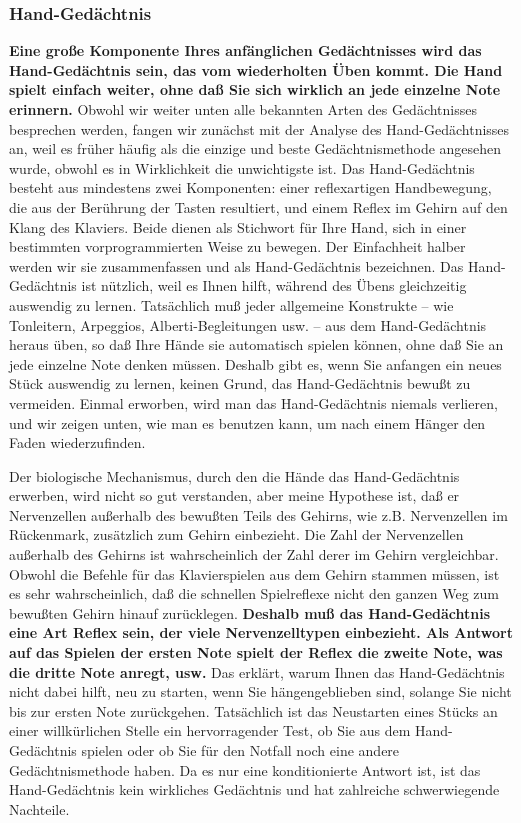 \subsubsection{Hand-Gedächtnis}
\label{c1iii6d}

\textbf{Eine große Komponente Ihres anfänglichen Gedächtnisses wird das Hand-Gedächtnis sein, das vom wiederholten Üben kommt.
Die Hand spielt einfach weiter, ohne daß Sie sich wirklich an jede einzelne Note  erinnern.}
Obwohl wir weiter unten alle bekannten Arten des Gedächtnisses besprechen werden, fangen wir zunächst mit der Analyse des Hand-Gedächtnisses an, weil es früher häufig als die einzige und beste Gedächtnismethode angesehen wurde, obwohl es in Wirklichkeit die unwichtigste ist.
Das Hand-Gedächtnis besteht aus mindestens zwei Komponenten: einer reflexartigen Handbewegung, die aus der Berührung der Tasten resultiert, und einem Reflex im Gehirn auf den Klang des Klaviers.
Beide dienen als Stichwort für Ihre Hand, sich in einer bestimmten vorprogrammierten Weise zu bewegen.
Der Einfachheit halber werden wir sie zusammenfassen und als Hand-Gedächtnis bezeichnen.
Das Hand-Gedächtnis ist nützlich, weil es Ihnen hilft, während des Übens gleichzeitig auswendig zu lernen.
Tatsächlich muß jeder allgemeine Konstrukte -- wie Tonleitern, Arpeggios, Alberti-Begleitungen usw. -- aus dem Hand-Gedächtnis heraus üben, so daß Ihre Hände sie automatisch spielen können, ohne daß Sie an jede einzelne Note denken müssen.
Deshalb gibt es, wenn Sie anfangen ein neues Stück auswendig zu lernen, keinen Grund, das Hand-Gedächtnis bewußt zu vermeiden.
Einmal erworben, wird man das Hand-Gedächtnis niemals verlieren, und wir zeigen unten, wie man es benutzen kann, um nach einem Hänger den Faden wiederzufinden.

Der biologische Mechanismus, durch den die Hände das Hand-Gedächtnis erwerben, wird nicht so gut verstanden, aber meine Hypothese ist, daß er Nervenzellen außerhalb des bewußten Teils des Gehirns, wie z.B. Nervenzellen im Rückenmark, zusätzlich zum Gehirn einbezieht.
Die Zahl der Nervenzellen außerhalb des Gehirns ist wahrscheinlich der Zahl derer im Gehirn vergleichbar.
Obwohl die Befehle für das Klavierspielen aus dem Gehirn stammen müssen, ist es sehr wahrscheinlich, daß die schnellen Spielreflexe nicht den ganzen Weg zum bewußten Gehirn hinauf zurücklegen.
\textbf{Deshalb muß das Hand-Gedächtnis eine Art Reflex sein, der viele Nervenzelltypen einbezieht.
Als Antwort auf das Spielen der ersten Note spielt der Reflex die zweite Note, was die dritte Note anregt, usw.}
Das erklärt, warum Ihnen das Hand-Gedächtnis nicht dabei hilft, neu zu starten, wenn Sie hängengeblieben sind, solange Sie nicht bis zur ersten Note zurückgehen.
Tatsächlich ist das Neustarten eines Stücks an einer willkürlichen Stelle ein hervorragender Test, ob Sie aus dem Hand-Gedächtnis spielen oder ob Sie für den Notfall noch eine andere Gedächtnismethode haben.
Da es nur eine konditionierte Antwort ist, ist das Hand-Gedächtnis kein wirkliches Gedächtnis und hat zahlreiche schwerwiegende Nachteile.

